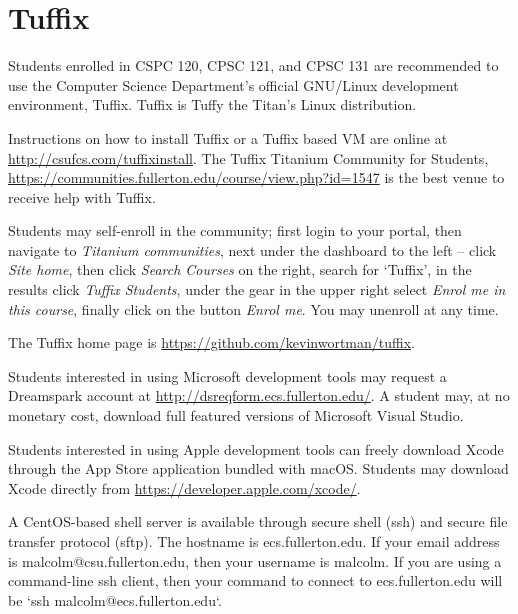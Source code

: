 \documentclass{book}
\newcommand{\shrunkurl}[1]{\url{http://csufcs.com/#1}}
\begin{document}
\section{Tuffix}

Students enrolled in CSPC 120, CPSC 121, and CPSC 131 are recommended
to use the Computer Science Department’s official GNU/Linux
development environment, Tuffix. Tuffix is Tuffy the Titan’s Linux
distribution.

Instructions on how to install Tuffix or a Tuffix based VM are online
at \shrunkurl{tuffixinstall}. The Tuffix Titanium Community for
Students,
\url{https://communities.fullerton.edu/course/view.php?id=1547} is the
best venue to receive help with Tuffix.

Students may self-enroll in the community; first login to your portal,
then navigate to \emph{Titanium communities}, next under the dashboard
to the left – click \emph{Site home}, then click \emph{Search Courses}
on the right, search for ‘Tuffix’, in the results click \emph{Tuffix
  Students}, under the gear in the upper right select \emph{Enrol me
  in this course}, finally click on the button \emph{Enrol me}. You
may unenroll at any time.

The Tuffix home page is \url{https://github.com/kevinwortman/tuffix}.

Students interested in using Microsoft development tools may request a
Dreamspark account at \url{http://dsreqform.ecs.fullerton.edu/}. A
student may, at no monetary cost, download full featured versions of
Microsoft Visual Studio.

Students interested in using Apple development tools can freely
download Xcode through the App Store application bundled with
macOS. Students may download Xcode directly from
\url{https://developer.apple.com/xcode/}.

A CentOS-based shell server is available through secure shell (ssh)
and secure file transfer protocol (sftp). The hostname is
ecs.fullerton.edu. If your email address is malcolm@csu.fullerton.edu,
then your username is malcolm. If you are using a command-line ssh
client, then your command to connect to ecs.fullerton.edu will be `ssh
malcolm@ecs.fullerton.edu`.


\end{document}
